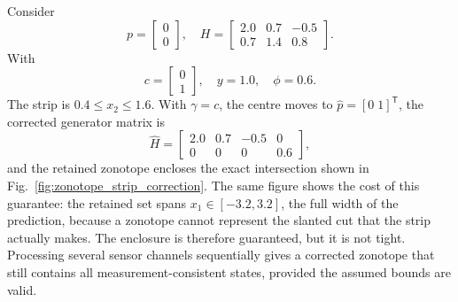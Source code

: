\begin{example}
\label{ex:zonotope-strip}
Consider
\begin{equation}
p=
\begin{bmatrix}
0\\
0
\end{bmatrix},
\quad
H=
\begin{bmatrix}
2.0 & 0.7 & -0.5\\
0.7 & 1.4 & 0.8
\end{bmatrix}.
\end{equation}
With
\begin{equation}
c=
\begin{bmatrix}
0\\
1
\end{bmatrix},
\quad
y=1.0,\quad
\phi=0.6.
\end{equation}
The strip is $0.4\le x_2\le1.6$. With $\gamma=c$, the centre moves to $\hat p=[0\;1]^{\mathsf T}$, the corrected generator matrix is
\begin{equation}
\hat H=
\begin{bmatrix}
2.0 & 0.7 & -0.5 & 0\\
0 & 0 & 0 & 0.6
\end{bmatrix},
\end{equation}
and the retained zonotope encloses the exact intersection shown in Fig.~\ref{fig:zonotope_strip_correction}. The same figure shows the cost of this guarantee: the retained set spans $x_1\in[-3.2,3.2]$, the full width of the prediction, because a zonotope cannot represent the slanted cut that the strip actually makes. The enclosure is therefore guaranteed, but it is not tight. Processing several sensor channels sequentially gives a corrected zonotope that still contains all measurement-consistent states, provided the assumed bounds are valid.
\end{example}



